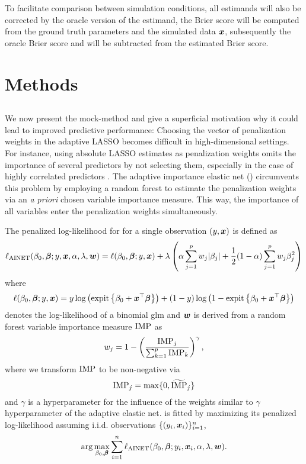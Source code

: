 \documentclass[a4paper, 11pt]{article}\usepackage[]{graphicx}\usepackage[]{color}
\begin{document}
To facilitate comparison between simulation conditions, all estimands will also
be corrected by the oracle version of the estimand, \eg the Brier score will be
computed from the ground truth parameters and the simulated data $\text{\boldmath$x$}$,
subsequently the oracle Brier score and will be subtracted from the estimated
Brier score.

\section{Methods} \label{sec:methods}

\subsection{\ainet}
We now present the mock-method and give a superficial motivation why it could
lead to improved predictive performance:
Choosing the vector of penalization weights in the adaptive LASSO becomes difficult
in high-dimensional settings. For instance, using absolute LASSO estimates as penalization
weights omits the importance of several predictors by not selecting them, 
especially in the case of highly correlated predictors \citep{Algamal2015}.
The adaptive importance elastic net (\ainet{}) circumvents this problem by
employing a random forest to estimate the
penalization weights via an \emph{a priori} chosen variable importance measure.
This way, the importance of all variables enter the penalization weights simultaneously.

The penalized log-likelihood for \ainet{} for a single observation $(y, \text{\boldmath$x$})$
is defined as
$$\ell_{\text{AINET}}(\beta_0, \text{\boldmath$\beta$}; y, \text{\boldmath$x$}, \alpha, \lambda, \text{\boldmath$w$}) = 
  \ell(\beta_0, \text{\boldmath$\beta$}; y, \text{\boldmath$x$}) + \lambda\left(\alpha \sum_{j = 1}^p{w_j\lvert\beta_j\rvert} + \frac{1}{2} (1-\alpha) \sum_{j=1}^p{w_j\beta_j^2} \right)$$
where
$$\ell(\beta_0, \text{\boldmath$\beta$}; y, \text{\boldmath$x$}) = 
  y \log\left(\operatorname{expit}\left\{\beta_0 + \text{\boldmath$x$}^\top\text{\boldmath$\beta$}\right\}\right)
  + (1 - y) \log\left(1 - \operatorname{expit}\left\{\beta_0 + \text{\boldmath$x$}^\top\text{\boldmath$\beta$}\right\}\right)$$
denotes the log-likelihood of a binomial glm and
$\text{\boldmath$w$}$ is derived from a random forest variable importance measure $\operatorname{IMP}$ as
$$w_j = 1 - \left(\frac{\operatorname{IMP}_j}{\sum_{k=1}^p \operatorname{IMP}_k}\right)^\gamma,$$
where we transform $\operatorname{IMP}$ to be non-negative via
$$\operatorname{IMP}_j = \max\{0, \widetilde{\operatorname{IMP}}_j\}$$
and $\gamma$ is a hyperparameter for the influence of the weights similar to
$\gamma$ hyperparameter of the adaptive elastic net.
\ainet{} is fitted by maximizing its penalized log-likelihood assuming i.i.d.
observations $\{(y_i, \text{\boldmath$x$}_i)\}_{i=1}^n$, \ie
$$\arg\max_{\beta_0, \text{\boldmath$\beta$}} \sum_{i = 1}^n \ell_{\text{AINET}}(\beta_0,
\text{\boldmath$\beta$}; y_i, \text{\boldmath$x$}_i, \alpha, \lambda, \text{\boldmath$w$}).$$
\end{document}
